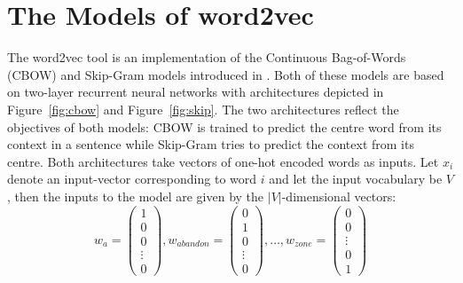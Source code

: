 \documentclass[conference]{IEEEtran}
\begin{document}
\section{The Models of word2vec}
\label{sec:model}

The word2vec tool is an implementation of the Continuous Bag-of-Words (CBOW) and Skip-Gram
models introduced in \cite{mikolov2013efficient}. Both of these models are based
on  two-layer recurrent neural networks with architectures depicted in Figure~\ref{fig:cbow}
and Figure~\ref{fig:skip}. The two architectures reflect the objectives of both models: CBOW
is trained to predict the centre word from its context in a sentence while Skip-Gram tries to predict
the context from its centre. Both architectures take vectors of one-hot encoded words as inputs. Let $x_i$
denote an input-vector corresponding to word $i$ and let the input vocabulary be $V$, 
then the inputs to the model are given by the $|V|$-dimensional vectors:
\begin{equation}
w_{a} = \begin{pmatrix}1 \\ 0 \\ 0 \\ \vdots \\ 0 \end{pmatrix},
w_{abandon} = \begin{pmatrix}0 \\ 1 \\ 0 \\ \vdots \\ 0 \end{pmatrix}, \dots ,
w_{zone} = \begin{pmatrix}0 \\ 0  \\ \vdots \\ 0 \\ 1 \end{pmatrix}
\end{equation}
\end{document}
